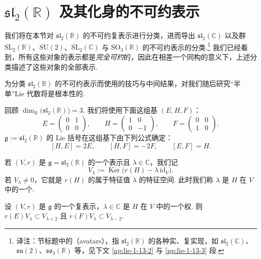 \section{$\mathfrak{sl}_2(\mathbb R)$ 及其化身的不可约表示}\label{sec:lie-1-13}

我们将在本节对 $\mathfrak{sl}_2(\mathbb R)$ 的不可约复表示进行分类，进而导出 $\mathfrak{sl}_2(\mathbb C)$ 以及群 $\mathrm{SL}_2(\mathbb R)$、$\mathrm{SU}(2)$、$\mathrm{SL}_2(\mathbb C)$ 与 $\mathrm{SO}_3(\mathbb R)$ 的不可约表示的分类.\footnote{译注：节标题中的（avatars），指 $\mathfrak{sl}_2(\mathbb R)$ 的各种实、复实现，如 $\mathfrak{sl}_2(\mathbb C)$、$\mathfrak{su}(2)$、$\mathfrak{so}_3(\mathbb R)$ 等，见下文 \ref{np:lie-1-13-2} 与 \ref{np:lie-1-13-3} 段.}
我们已经看到，所有这些对象的表示都是\emph{完全可约}的，因此在相差一个同构的意义下，上述分类描述了这些对象的全部表示.

为分类 $\mathfrak{sl}_2(\mathbb R)$ 的不可约表示而使用的技巧与中间结果，对我们随后研究``半单''Lie 代数将是根本性的.

\begin{numpara}[$\mathfrak{g}=\mathfrak{sl}_2(\mathbb R)$ 的不可约表示]\label{np:lie-1-13-1}
回顾 $\dim_{\mathbb R}\bigl(\mathfrak{sl}_2(\mathbb R)\bigr)=3$. 我们将使用下面这组基 $(E,H,F)$：
\[
E=\begin{pmatrix}0&1\\0&0\end{pmatrix},\qquad
H=\begin{pmatrix}1&0\\0&-1\end{pmatrix},\qquad
F=\begin{pmatrix}0&0\\1&0\end{pmatrix}.
\]
$\mathfrak{g}:=\mathfrak{sl}_2(\mathbb R)$ 的 Lie 括号在这组基下由下列公式确定：
\[
[H,E]=2E,\qquad [H,F]=-2F,\qquad [E,F]=H.
\]
\par
若 $(V,r)$ 是 $\mathfrak{g}=\mathfrak{sl}_2(\mathbb R)$ 的一个表示且 $\lambda\in\mathbb C$，我们记
\[
V_\lambda:=\operatorname{Ker}\bigl(r(H)-\lambda\,\mathrm{id}_V\bigr).
\]
若 $V_\lambda\neq 0$，它就是 $r(H)$ 的属于特征值 $\lambda$ 的特征空间. 此时我们称 $\lambda$ 是 $H$ 在 $V$ 中的一个.
\end{numpara}

\begin{lemma*}
设 $(V,r)$ 是 $\mathfrak{g}$ 的一个复表示，$\lambda\in\mathbb C$ 是 $H$ 在 $V$ 中的一个权. 则 $r(E)V_\lambda\subset V_{\lambda+2}$ 且 $r(F)V_\lambda\subset V_{\lambda-2}$.
\end{lemma*}

